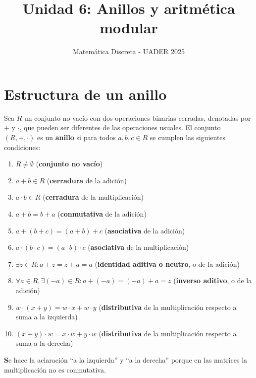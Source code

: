 \documentclass[12pt]{article}
\title{Unidad 6: Anillos y aritmética modular}
\author{Matemática Discreta - UADER 2025}
\date{}
\begin{document}
\maketitle

\section*{Estructura de un anillo}

\begin{tcolorbox}[title=Definición de anillo]
Sea \( R \) un conjunto no vacío con dos operaciones binarias cerradas, denotadas por \( + \) y \( \cdot \), que pueden ser diferentes de las operaciones usuales. El conjunto \( (R, +, \cdot) \) es un \textbf{anillo} si para todos \( a, b, c \in R \) se cumplen las siguientes condiciones:
\begin{enumerate}
    \item \( R \neq \emptyset \) (\textbf{conjunto no vacío})
    \item \( a + b \in R \) (\textbf{cerradura} de la adición)
    \item \( a \cdot b \in R \) (\textbf{cerradura} de la multiplicación)
    \item \( a + b = b + a \) (\textbf{conmutativa} de la adición)
    \item \( a + (b + c) = (a + b) + c \) (\textbf{asociativa} de la adición)
    \item \( a \cdot (b \cdot c) = (a \cdot b) \cdot c \) (\textbf{asociativa} de la multiplicación)
    \item \( \exists z \in R : a + z = z + a = a \) (\textbf{identidad aditiva o neutro}, o de la adición)
    \item \( \forall a \in R, \exists (-a) \in R : a + (-a) = (-a) + a = z \) (\textbf{inverso aditivo}, o de la adición)
    \item \( w \cdot (x + y) = w \cdot x + w \cdot y \) (\textbf{distributiva} de la multiplicación respecto a suma a la izquierda)
    \item \( (x + y) \cdot w = x \cdot w + y \cdot w \) (\textbf{distributiva} de la multiplicación respecto a suma a la derecha)
\end{enumerate}
\end{tcolorbox}

\begin{tcolorbox}[colback=yellow!15, title=Aclaración]
\textbf Se hace la aclaración ``a la izquierda'' y ``a la derecha'' porque en las matrices la multiplicación no es conmutativa.
\end{tcolorbox}
\end{document}
